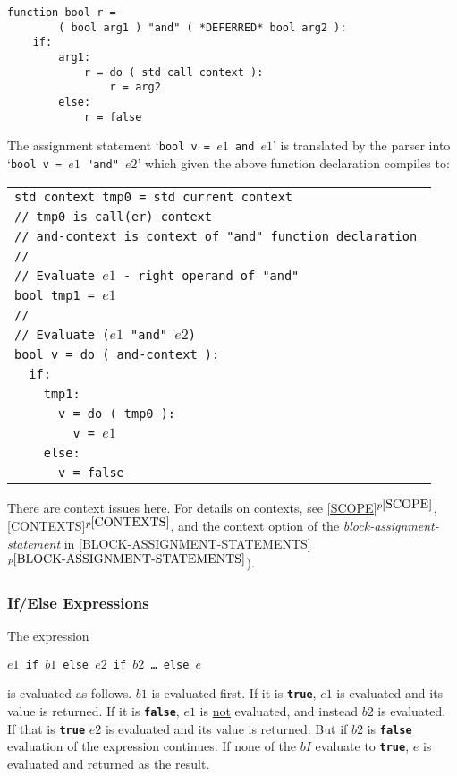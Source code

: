 \documentclass[12pt]{article}
\newcommand{\TT}[1]{{\tt \bfseries #1}}
\newcommand{\itemref}[1]{\ref{#1}$^{p\pageref{#1}}$}
\newenvironment{indpar}[1][0.3in]%
	{\begin{list}{}%
		     {\setlength{\itemsep}{0in}%
		      \setlength{\topsep}{0in}%
		      \setlength{\parsep}{1ex}%
		      \setlength{\labelwidth}{#1}%
		      \setlength{\leftmargin}{#1}%
		      \addtolength{\leftmargin}{\labelsep}}%
	 \item}%
	{\end{list}}
\begin{document}
\begin{indpar}\begin{verbatim}
function bool r =
        ( bool arg1 ) "and" ( *DEFERRED* bool arg2 ):
    if:
        arg1:
            r = do ( std call context ):
                r = arg2
        else:
            r = false
\end{verbatim}\end{indpar}

The assignment statement `{\tt bool v = $e1$ and $e1$}' is
translated by the parser into `{\tt bool v = $e1$ "and" $e2$}' which
given the above function declaration compiles to:
\begin{indpar}
\begin{tabular}{l}
\tt std context tmp0 = std current context \\
\tt // tmp0 is call(er) context \\
\tt // and-context is context of "and" function declaration \\
\tt // \\
\tt // Evaluate $e1$ - right operand of "and"\\
\tt bool tmp1 = $e1$ \\
\tt // \\
\tt // Evaluate ($e1$ "and" $e2$) \\
\tt bool v = do ( and-context ): \\
\tt ~~if: \\
\tt ~~~~tmp1: \\
\tt ~~~~~~v = do ( tmp0 ): \\
\tt ~~~~~~~~v = $e1$ \\
\tt ~~~~else: \\
\tt ~~~~~~v = false \\
\end{tabular}
\end{indpar}

There are context issues here.  For details on contexts,
see \itemref{SCOPE},
\itemref{CONTEXTS}, and the context option of the
{\em block-assignment-statement} in 
\itemref{BLOCK-ASSIGNMENT-STATEMENTS}).

\subsubsection{If/Else Expressions}

The expression
\begin{center}
\tt $e1$ if $b1$ else $e2$ if $b2$ \ldots{} else $e$
\end{center}
is evaluated as follows.
$b1$ is evaluated first.  If it is \TT{true}, $e1$ is evaluated and its
value is returned.  If it is \TT{false}, $e1$ is \underline{not}
evaluated, and instead $b2$ is evaluated.  If that is \TT{true}
$e2$ is evaluated and its value is returned.  But if $b2$ is \TT{false}
evaluation of the expression continues.  If none of
the $bI$ evaluate to \TT{true}, $e$ is evaluated and returned as the result.
\end{document}
